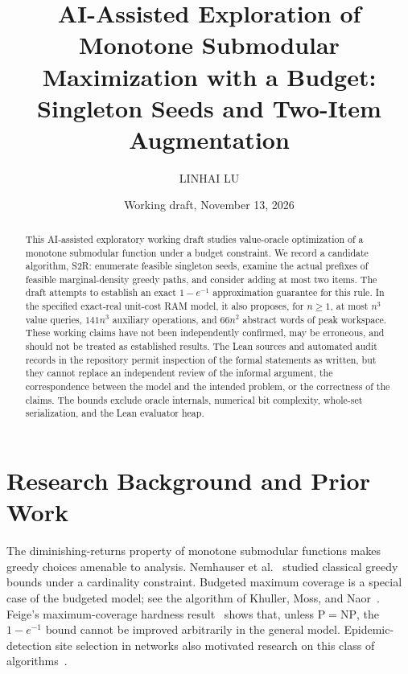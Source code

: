 \documentclass[11pt,a4paper]{article}
\title{AI-Assisted Exploration of Monotone Submodular Maximization with a Budget:\\Singleton Seeds and Two-Item Augmentation}
\author{LINHAI LU}
\date{Working draft, November 13, 2026}
\begin{document}
\maketitle



\begin{abstract}

This AI-assisted exploratory working draft studies value-oracle optimization of a monotone submodular function under a budget constraint. We record a candidate algorithm, S2R: enumerate feasible singleton seeds, examine the actual prefixes of feasible marginal-density greedy paths, and consider adding at most two items. The draft attempts to establish an exact $1-e^{-1}$ approximation guarantee for this rule. In the specified exact-real unit-cost RAM model, it also proposes, for $n\ge1$, at most $n^3$ value queries, $141n^3$ auxiliary operations, and $66n^2$ abstract words of peak workspace. These working claims have not been independently confirmed, may be erroneous, and should not be treated as established results. The Lean sources and automated audit records in the repository permit inspection of the formal statements as written, but they cannot replace an independent review of the informal argument, the correspondence between the model and the intended problem, or the correctness of the claims. The bounds exclude oracle internals, numerical bit complexity, whole-set serialization, and the Lean evaluator heap.

\end{abstract}

\section*{Research Background and Prior Work}

The diminishing-returns property of monotone submodular functions makes greedy choices amenable to analysis.
Nemhauser et al.~\cite{nemhauser1978} studied classical greedy bounds under a cardinality constraint.
Budgeted maximum coverage is a special case of the budgeted model; see the algorithm of Khuller, Moss, and Naor~\cite{khuller1999}.
Feige's maximum-coverage hardness result~\cite{feige1998} shows that, unless $\mathrm P=\mathrm{NP}$,
the $1-e^{-1}$ bound cannot be improved arbitrarily in the general model.
Epidemic-detection site selection in networks also motivated research on this class of algorithms~\cite{leskovec2007}.
\end{document}
